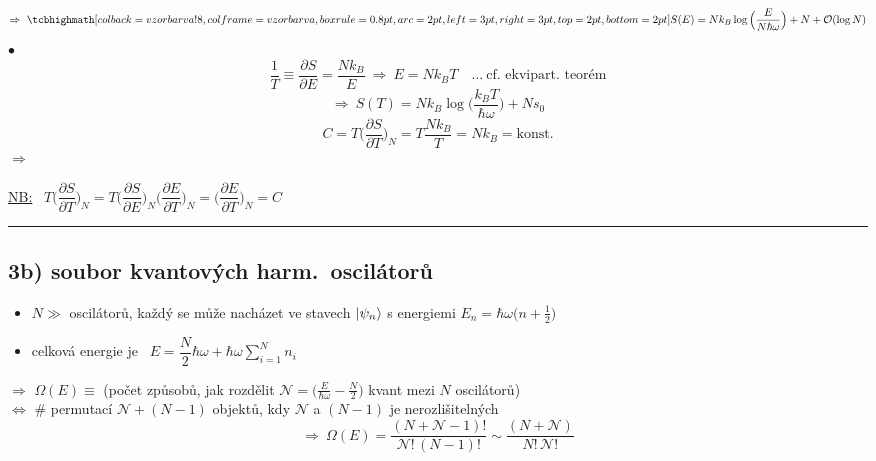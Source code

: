 {\color{NavyBlue}
\[
  \Rightarrow\ \vzorec{S(E) = Nk_B\log\Big(\frac{E}{N\hbar\omega}\Big) + N + \mathcal{O}(\log N)}
\]
$\bullet$ 
\[
  \frac1T \equiv \frac{\partial S}{\partial E} = \frac{Nk_B}{E} \ \Rightarrow\ E = Nk_BT \quad\dots\ \text{cf.\ ekvipart.\ teorém}
\]
\[
  \Rightarrow\ S(T) = Nk_B\log\Big(\frac{k_BT}{\hbar\omega}\Big) + Ns_0
\]
\[
  C = T\Big(\frac{\partial S}{\partial T}\Big)_N = T\frac{Nk_B}{T} = Nk_B = \text{konst.}
\]
\hspace*{5cm}$\Rightarrow$ 

\underline{NB:} \ $T\Big(\dfrac{\partial S}{\partial T}\Big)_N = T\Big(\dfrac{\partial S}{\partial E}\Big)_N\Big(\dfrac{\partial E}{\partial T}\Big)_N
= \Big(\dfrac{\partial E}{\partial T}\Big)_N = C$

\noindent\rule{\linewidth}{0.4pt}

\subsection*{3b) soubor kvantových harm.\ oscilátorů}
\begin{itemize}
  \item $N \gg$ oscilátorů, každý se může nacházet ve stavech $\ket{\psi_n}$ s energiemi $E_n = \hbar\omega\big(n + \frac12\big)$
  \item celková energie je \ $E = \dfrac N2\hbar\omega + \hbar\omega\displaystyle\sum_{i=1}^{N}n_i$
\end{itemize}
$\Rightarrow$ $\Omega(E) \equiv$ (počet způsobů, jak rozdělit $\mathcal{N} = \big(\frac{E}{\hbar\omega} - \frac N2\big)$ kvant mezi $N$ oscilátorů) \\
$\Leftrightarrow$ \# permutací $\mathcal{N} + (N-1)$ objektů, kdy $\mathcal{N}$ a $(N-1)$ je nerozlišitelných
\[
  \Rightarrow\ \Omega(E) = \frac{(N + \mathcal{N} - 1)!}{\mathcal{N}!\,(N-1)!} \sim \frac{(N + \mathcal{N})}{N!\,\mathcal{N}!}
\]
}

